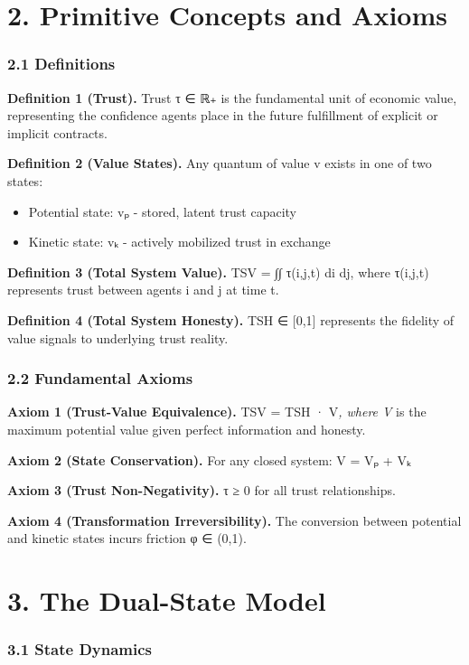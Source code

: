 \documentclass[11pt,oneside]{book}
\begin{document}
\section{2. Primitive Concepts and Axioms}

\subsubsection{2.1 Definitions}

\textbf{Definition 1 (Trust).} Trust τ ∈ ℝ₊ is the fundamental unit of economic value, representing the confidence agents place in the future fulfillment of explicit or implicit contracts.

\textbf{Definition 2 (Value States).} Any quantum of value v exists in one of two states:
\begin{itemize}
\item Potential state: vₚ - stored, latent trust capacity
\item Kinetic state: vₖ - actively mobilized trust in exchange
\end{itemize}

\textbf{Definition 3 (Total System Value).} TSV = ∫∫ τ(i,j,t) di dj, where τ(i,j,t) represents trust between agents i and j at time t.

\textbf{Definition 4 (Total System Honesty).} TSH ∈ [0,1] represents the fidelity of value signals to underlying trust reality.

\subsubsection{2.2 Fundamental Axioms}

\textbf{Axiom 1 (Trust-Value Equivalence).} TSV = TSH · V\textit{, where V} is the maximum potential value given perfect information and honesty.

\textbf{Axiom 2 (State Conservation).} For any closed system: V = Vₚ + Vₖ

\textbf{Axiom 3 (Trust Non-Negativity).} τ ≥ 0 for all trust relationships.

\textbf{Axiom 4 (Transformation Irreversibility).} The conversion between potential and kinetic states incurs friction φ ∈ (0,1).

\section{3. The Dual-State Model}

\subsubsection{3.1 State Dynamics}
\end{document}
